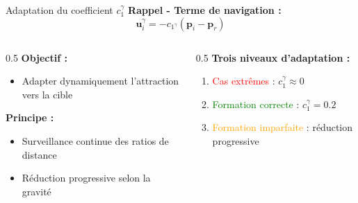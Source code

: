 \begin{frame}{Adaptation du coefficient $c_1^\gamma$}
    \textbf{Rappel - Terme de navigation :}
    \begin{equation}
        \mathbf{u}_i^{\gamma} = -c_{1^\gamma}(\mathbf{p}_i - \mathbf{p}_r)
    \end{equation}
    
    \begin{columns}
        \begin{column}{0.5\textwidth}
            \textbf{Objectif :}
            \begin{itemize}
                \item Adapter dynamiquement l'attraction vers la cible
            \end{itemize}
            
            \vspace{0.5cm}
            \textbf{Principe :}
            \begin{itemize}
                \item Surveillance continue des ratios de distance
                \item Réduction progressive selon la gravité
            \end{itemize}
        \end{column}
        \begin{column}{0.5\textwidth}
            \textbf{Trois niveaux d'adaptation :}
            \begin{enumerate}
                \item \textcolor{red}{Cas extrêmes} : $c_1^\gamma \approx 0$
                \item \textcolor{green}{Formation correcte} : $c_1^\gamma = 0.2$
                \item \textcolor{orange}{Formation imparfaite} : réduction progressive
            \end{enumerate}
                        
        \end{column}
    \end{columns}
\end{frame}
